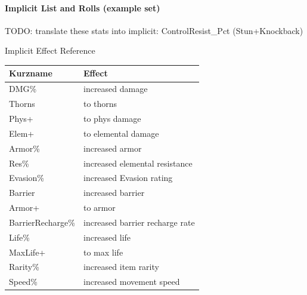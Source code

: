 \paragraph{Implicit List and Rolls (example set)}

TODO: translate these stats into implicit:
ControlResist\_Pct (Stun+Knockback)

Implicit Effect Reference \\
\begin{tabular}{|l|l|}
	\hline
	\textbf{Kurzname} & \textbf{Effect} \\
	\hline
	DMG\%       & increased damage \\
	Thorns      & to thorns \\
	Phys+       & to phys damage \\
	Elem+       & to elemental damage \\
	Armor\%     & increased armor \\
	Res\%       & increased elemental resistance \\
	Evasion\%   & increased Evasion rating \\
	Barrier     & increased barrier \\
	Armor+      & to armor \\
	BarrierRecharge\% & increased barrier recharge rate \\
	Life\%      & increased life \\
	MaxLife+    & to max life \\
	Rarity\%    & increased item rarity \\
	Speed\%     & increased movement speed \\
	\hline
\end{tabular}
\\

